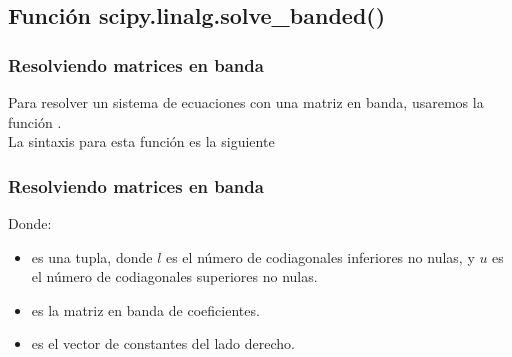 \subsection{Función scipy.linalg.solve\_banded()}
\begin{frame}[fragile]
\frametitle{Resolviendo matrices en banda}
Para resolver un sistema de ecuaciones con una matriz en banda, usaremos la función .
\\
\bigskip
\pause
La sintaxis para esta función es la siguiente
\begin{alltt}
\end{alltt}
\end{frame}
\begin{frame}[fragile]
\frametitle{Resolviendo matrices en banda}
\begin{alltt}
\end{alltt}
Donde:
\begin{itemize}[<+->]
\item {} es una tupla, donde $l$ es el número de codiagonales inferiores no nulas, y $u$ es el número de codiagonales superiores no nulas.
\item {} es la matriz en banda de coeficientes.
\item {} es el vector de constantes del lado derecho.
\end{itemize}
\end{frame}

